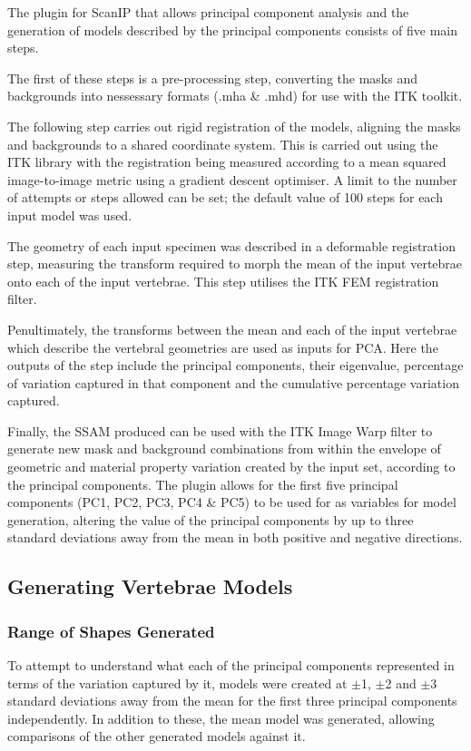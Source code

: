 The plugin for ScanIP that allows principal component analysis and the
generation of models described by the principal components consists of five
main steps.

The first of these steps is a pre-processing step, converting the masks and
backgrounds into nessessary formats (.mha \& .mhd) for use with the ITK
toolkit.

The following step carries out rigid registration of the models, aligning the
masks and backgrounds to a shared coordinate system.  This is carried out using
the ITK library with the registration being measured according to a mean
squared image-to-image metric using a gradient descent optimiser.  A limit to
the number of attempts or steps allowed can be set; the default value of 100
steps for each input model was used.

The geometry of each input specimen was described in a deformable registration
step, measuring the transform required to morph the mean of the input vertebrae
onto each of the input vertebrae.  This step utilises the ITK FEM registration
filter.

Penultimately, the transforms between the mean and each of the input vertebrae
which describe the vertebral geometries are used as inputs for PCA.  Here the
outputs of the step include the principal components, their eigenvalue,
percentage of variation captured in that component and the cumulative
percentage variation captured.

Finally, the SSAM produced can be used with the ITK Image Warp filter to
generate new mask and background combinations from within the envelope of
geometric and material property variation created by the input set, according
to the principal components.  The plugin allows for the first five principal
components (PC1, PC2, PC3, PC4 \& PC5) to be used for as variables for model
generation, altering the value of the principal components by up to three
standard deviations away from the mean in both positive and negative
directions.

\subsection{Generating Vertebrae Models}

\subsubsection{Range of Shapes Generated}

To attempt to understand what each of the principal components represented in
terms of the variation captured by it, models were created at $\pm$1, $\pm$2
and $\pm$3 standard deviations away from the mean for the first three principal
components independently.  In addition to these, the mean model was generated,
allowing comparisons of the other generated models against it.

